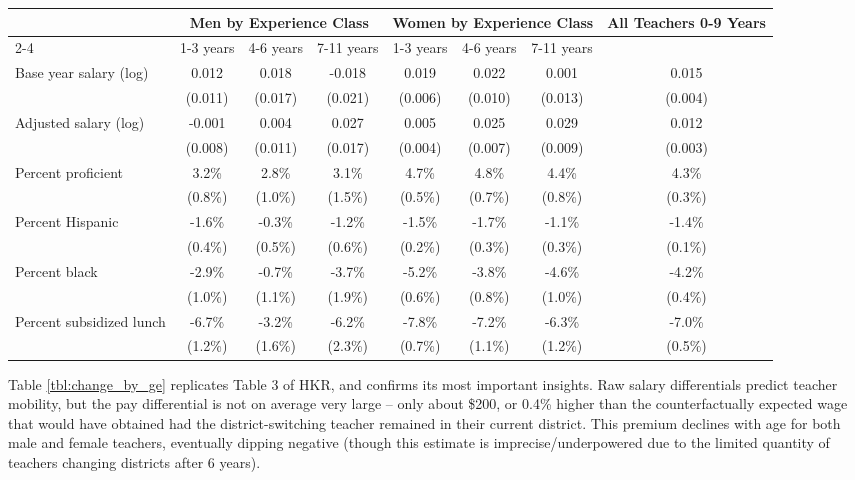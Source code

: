 \documentclass[]{article}
\begin{document}
\begin{sidewaystable}[htbp]
\centering
\begin{tabular}{lccccccc}
  \hline
 & \multicolumn{3}{c}{Men by Experience Class} & \multicolumn{3}{c}{Women by Experience Class} & \multirow{2}{*}{\parbox{0.09\linewidth}{All Teachers 0-9 Years}}\\ \cline{2-4} \cline{5-7}
 & 1-3 years & 4-6 years & 7-11 years & 1-3 years & 4-6 years & 7-11 years &  \\ 
  \hline
Base year salary (log) & 0.012 & 0.018 & -0.018 & 0.019 & 0.022 & 0.001 & 0.015 \\ 
   & (0.011) & (0.017) & (0.021) & (0.006) & (0.010) & (0.013) & (0.004) \\ 
  Adjusted salary (log) & -0.001 & 0.004 & 0.027 & 0.005 & 0.025 & 0.029 & 0.012 \\ 
   & (0.008) & (0.011) & (0.017) & (0.004) & (0.007) & (0.009) & (0.003) \\ 
  Percent proficient & 3.2\% & 2.8\% & 3.1\% & 4.7\% & 4.8\% & 4.4\% & 4.3\% \\ 
   & (0.8\%) & (1.0\%) & (1.5\%) & (0.5\%) & (0.7\%) & (0.8\%) & (0.3\%) \\ 
  Percent Hispanic & -1.6\% & -0.3\% & -1.2\% & -1.5\% & -1.7\% & -1.1\% & -1.4\% \\ 
   & (0.4\%) & (0.5\%) & (0.6\%) & (0.2\%) & (0.3\%) & (0.3\%) & (0.1\%) \\ 
  Percent black & -2.9\% & -0.7\% & -3.7\% & -5.2\% & -3.8\% & -4.6\% & -4.2\% \\ 
   & (1.0\%) & (1.1\%) & (1.9\%) & (0.6\%) & (0.8\%) & (1.0\%) & (0.4\%) \\ 
  Percent subsidized lunch & -6.7\% & -3.2\% & -6.2\% & -7.8\% & -7.2\% & -6.3\% & -7.0\% \\ 
   & (1.2\%) & (1.6\%) & (2.3\%) & (0.7\%) & (1.1\%) & (1.2\%) & (0.5\%) \\ 
   \hline
\end{tabular}
\caption{Average Change in Salary and District Student Characteristics (and Standard Deviations) for Teachers Changing Districts, by Gender and Experience} 
\label{tbl:change_by_ge}
\end{sidewaystable}

Table \ref{tbl:change_by_ge} replicates Table 3 of HKR, and confirms its
most important insights. Raw salary differentials predict teacher
mobility, but the pay differential is not on average very large -- only
about \$200, or 0.4\% higher than the counterfactually expected wage
that would have obtained had the district-switching teacher remained in
their current district. This premium declines with age for both male and
female teachers, eventually dipping negative (though this estimate is
imprecise/underpowered due to the limited quantity of teachers changing
districts after 6 years).
\end{document}
